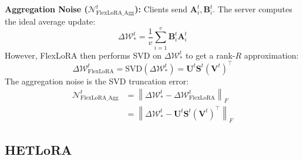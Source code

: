 \documentclass{article} %
\newcommand{\mat}[1]{\mathbf{#1}}
\begin{document}
\textbf{Aggregation Noise ($\mathcal{N}_{\text{FlexLoRA\_Agg}}^{t}$):} Clients send $\mat{A}_i^t, \mat{B}_i^t$. The server computes the ideal average update:
$$\Delta \boldsymbol{\mathcal{W}}_{*}^t = \frac{1}{v}\sum_{i=1}^{v}\mat{B}_i^t \mat{A}_i^t$$
However, FlexLoRA then performs SVD on $\Delta \boldsymbol{\mathcal{W}}_{*}^t$ to get a rank-$R$ approximation:
$$\Delta\boldsymbol{\mathcal{W}}_{\text{FlexLoRA}}^t = \text{SVD}(\Delta \boldsymbol{\mathcal{W}}_{*}^t) = \mat{U}^t \mat{S}^t (\mat{V}^t)^\top$$
The aggregation noise is the SVD truncation error:
\begin{align*}
\mathcal{N}_{\text{FlexLoRA\_Agg}}^{t} &= \left\| \Delta \boldsymbol{\mathcal{W}}_{*}^t - \Delta\boldsymbol{\mathcal{W}}_{\text{FlexLoRA}}^t \right\|_F \\
&= \left\| \Delta \boldsymbol{\mathcal{W}}_{*}^t - \mat{U}^t \mat{S}^t (\mat{V}^t)^\top \right\|_F
\end{align*}


\subsection{HETLoRA}
\label{appendixsubsection:hetlora}

\end{document}
